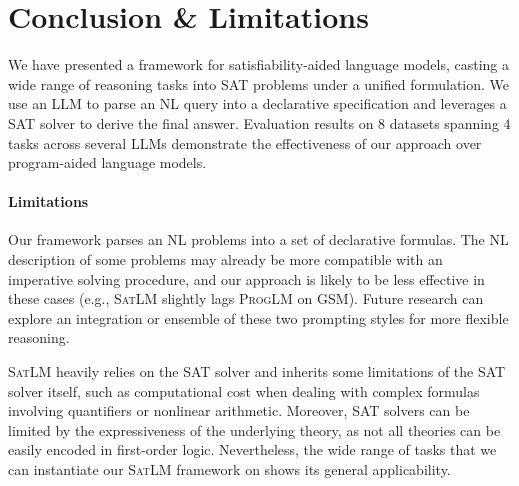 \documentclass{article}
\theoremstyle{definition}
\newcommand{\gsm}{\textsc{GSM}}
\newcommand{\satlm}{\textsc{SatLM}}
\newcommand{\pallm}{\textsc{ProgLM}}
\begin{document}
\section{Conclusion \& Limitations}

We have presented a framework for satisfiability-aided language models, casting a wide range of reasoning tasks into SAT problems under a unified formulation. We use an LLM to parse an NL query into a declarative specification and leverages a SAT solver to derive the final answer. Evaluation results on 8 datasets spanning 4 tasks across several LLMs demonstrate the effectiveness of our approach over program-aided language models. %

\paragraph{Limitations}
Our framework parses an NL problems into a set of declarative formulas. The NL description of some problems may already be more compatible with an imperative solving procedure, and our approach is likely to be less effective in these cases (e.g., \satlm{} slightly lags \pallm{} on \gsm{}). Future research can explore an integration or ensemble of these two prompting styles for more flexible reasoning.


\satlm{} heavily relies on the SAT solver and inherits some limitations of the SAT solver itself, such as computational cost when dealing with complex formulas involving quantifiers or nonlinear arithmetic. Moreover, SAT solvers can be limited by the expressiveness of the underlying theory, as not all theories can be easily encoded in first-order logic. Nevertheless, the wide range of tasks that we can instantiate our \satlm{} framework on shows its general applicability.
\end{document}
